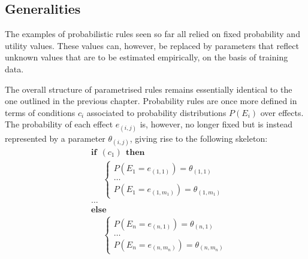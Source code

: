 \subsection{Generalities}

The examples of probabilistic rules seen so far all relied on fixed probability and utility values. These values can, however, be replaced by parameters that reflect unknown values that are to be estimated empirically, on the basis of training data. 
 
The overall structure of parametrised rules remains essentially identical to the one outlined in the previous chapter.  Probability rules are once more defined in terms of conditions $c_i$ associated to probability distributions $P(E_i)$ over effects.  The probability of each effect $e_{(i,j)}$ is, however, no longer fixed but is instead represented by a parameter $\theta_{(i,j)}$, giving rise to the following skeleton: 
\begin{equation}
\begin{aligned}
& \textbf{if} \ \ (c_{1}) \ \ \textbf{then} \\ 
& \;\;\;\;\; \begin{cases}
P(E_1\!=\!e_{(1,1)}) = \theta_{(1,1)} \\
 \dots \\
P(E_1\!=\!e_{(1,m_1)}) = \theta_{(1,m_1)} 
\end{cases} \\[3mm]
& \dots  \\
& \textbf{else} \\
& \;\;\;\;\; \begin{cases}
P(E_{n}\!=\!e_{(n,1)}) = \theta_{(n,1)} \\
\dots \\
P(E_{n}\!=\!e_{(n,m_n)}) = \theta_{(n,m_n)}
\end{cases}
\end{aligned}
\end{equation}

